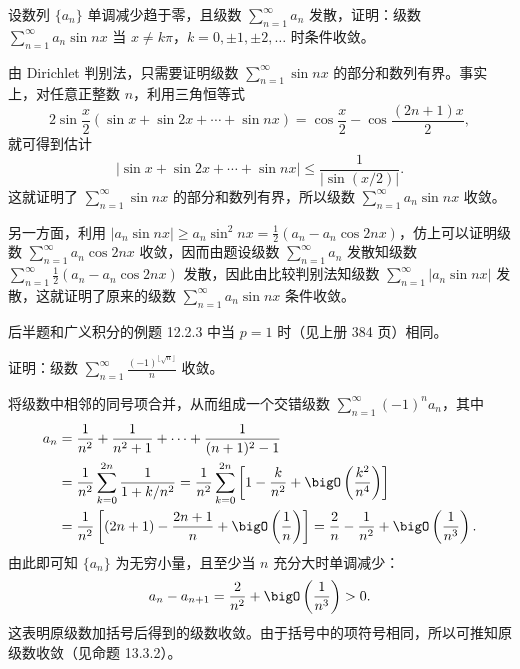 \begin{xexample}[13.3.3]
设数列 $\{a_n\}$ 单调减少趋于零，且级数 $\sum_{n=1}^{\infty}a_n$ 发散，证明：级数 $\sum_{n=1}^{\infty}a_n\sin nx$ 当 $x\neq k\pi$，$k=0,\pm1,\pm2,\ldots$ 时条件收敛。
\end{xexample}
\begin{xproof}
由 Dirichlet 判别法，只需要证明级数 $\sum_{n=1}^{\infty}\sin nx$ 的部分和数列有界。事实上，对任意正整数 $n$，利用三角恒等式
\[
2\sin\frac x2(\sin x+\sin2x+\cdots+\sin nx)=\cos\frac x2-\cos\frac{(2n+1)x}{2},
\]
就可得到估计
\[
|\sin x+\sin2x+\cdots+\sin nx|\leq\frac1{|\sin(x/2)|}.
\]
这就证明了 $\sum_{n=1}^{\infty}\sin nx$ 的部分和数列有界，所以级数 $\sum_{n=1}^{\infty}a_n\sin nx$ 收敛。

另一方面，利用 $|a_n\sin nx|\geq a_n\sin^2nx=\frac12(a_n-a_n\cos2nx)$，仿上可以证明级数 $\sum_{n=1}^{\infty}a_n\cos2nx$ 收敛，因而由题设级数 $\sum_{n=1}^{\infty}a_n$ 发散知级数 $\sum_{n=1}^{\infty}\frac12(a_n-a_n\cos2nx)$ 发散，因此由比较判别法知级数 $\sum_{n=1}^{\infty}|a_n\sin nx|$ 发散，这就证明了原来的级数 $\sum_{n=1}^{\infty}a_n\sin nx$ 条件收敛。
\end{xproof}

\begin{xremark}
后半题和广义积分的例题 12.2.3 中当 $p=1$ 时（见上册 384 页）相同。
\end{xremark}

\begin{xexample}[13.3.4]
证明：级数 $\sum_{n=1}^{\infty}\frac{(-1)^{\lfloor\sqrt n\rfloor}}n$ 收敛。
\end{xexample}
\begin{xsolution}
将级数中相邻的同号项合并，从而组成一个交错级数 $\sum_{n=1}^{\infty}(-1)^na_n$，其中
\[
\begin{aligned}
a_n&=\frac1{n^2}+\frac1{n^2+1}+\cdots+\frac1{(n+1)^2-1}\\
&=\frac1{n^2}\sum_{k=0}^{2n}\frac1{1+k/n^2}
=\frac1{n^2}\sum_{k=0}^{2n}\left[1-\frac{k}{n^2}+\bigO\left(\frac{k^2}{n^4}\right)\right]\\
&=\frac1{n^2}\left[(2n+1)-\frac{2n+1}{n}+\bigO\left(\frac1n\right)\right]
=\frac2n-\frac1{n^2}+\bigO\left(\frac1{n^3}\right).
\end{aligned}
\]
由此即可知 $\{a_n\}$ 为无穷小量，且至少当 $n$ 充分大时单调减少：
\[
a_n-a_{n+1}=\frac2{n^2}+\bigO\left(\frac1{n^3}\right)>0.
\]
这表明原级数加括号后得到的级数收敛。由于括号中的项符号相同，所以可推知原级数收敛（见命题 13.3.2）。
\end{xsolution}

